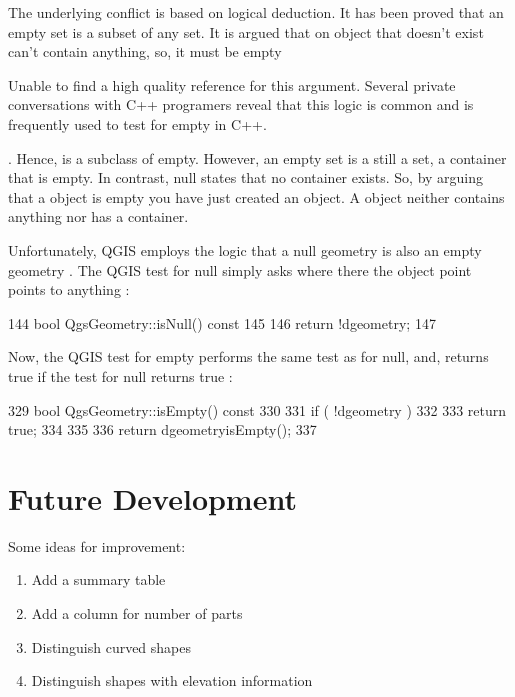\documentclass[letterpaper,10pt,english]{sphinxmanual}
\begin{document}
The underlying conflict is based on logical deduction.  It has been proved that an empty set is a subset of any set.  It is argued that on object that doesn’t exist can’t contain anything, so, it must be empty %
\begin{footnote}[3]\sphinxAtStartFootnote
Unable to find a high quality reference for this argument.  Several private conversations with C++ programers reveal that this logic is common and is frequently used to test for empty in C++.
%
\end{footnote}.  Hence,  is a subclass of empty.  However, an empty set is a still a set, a container that is empty.  In contrast, null states that no container exists.  So, by arguing that a  object is empty you have just created an object.  A  object neither contains anything nor has a container.

Unfortunately, QGIS employs the logic that a null geometry is also an empty geometry .    The QGIS test for null simply asks where there the object point points to anything :

%
\begin{sphinxVerbatim}[commandchars=\\\{\}]
144 bool QgsGeometry::isNull() const
145 \PYGZob{}
146  return !d\PYGZhy{}\PYGZgt{}geometry;
147 \PYGZcb{}
\end{sphinxVerbatim}

Now, the QGIS test for empty performs the same test as for null, and, returns true if the test for null returns true :

%
\begin{sphinxVerbatim}[commandchars=\\\{\}]
329 bool QgsGeometry::isEmpty() const
330 \PYGZob{}
331  if ( !d\PYGZhy{}\PYGZgt{}geometry )
332  \PYGZob{}
333  return true;
334  \PYGZcb{}
335
336  return d\PYGZhy{}\PYGZgt{}geometry\PYGZhy{}\PYGZgt{}isEmpty();
337 \PYGZcb{}
\end{sphinxVerbatim}


\section{Future Development}
\label{\detokenize{concept:future-development}}
Some ideas for improvement:
\begin{enumerate}
\def\theenumi{\arabic{enumi}}
\def\labelenumi{\theenumi .}
\makeatletter\def\p@enumii{\p@enumi \theenumi .}\makeatother
\item {} 
Add a summary table

\item {} 
Add a column for number of parts

\item {} 
Distinguish curved shapes

\item {} 
Distinguish shapes with elevation information

\end{enumerate}
\end{document}
